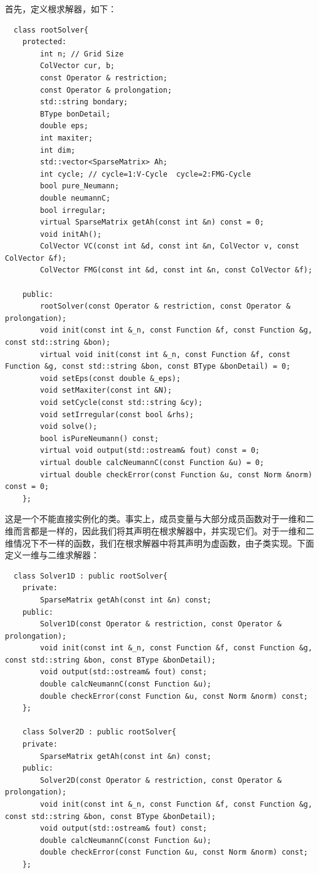 \documentclass[lang=cn,10pt]{elegantbook}
\begin{document}
首先，定义根求解器，如下：
\begin{lstlisting}
  class rootSolver{
    protected:
        int n; // Grid Size
        ColVector cur, b;
        const Operator & restriction;
        const Operator & prolongation;
        std::string bondary;
        BType bonDetail;
        double eps;
        int maxiter;
        int dim;
        std::vector<SparseMatrix> Ah;
        int cycle; // cycle=1:V-Cycle  cycle=2:FMG-Cycle
        bool pure_Neumann;
        double neumannC;
        bool irregular;
        virtual SparseMatrix getAh(const int &n) const = 0;
        void initAh();
        ColVector VC(const int &d, const int &n, ColVector v, const ColVector &f);
        ColVector FMG(const int &d, const int &n, const ColVector &f);
    
    public:
        rootSolver(const Operator & restriction, const Operator & prolongation);
        void init(const int &_n, const Function &f, const Function &g, const std::string &bon);
        virtual void init(const int &_n, const Function &f, const Function &g, const std::string &bon, const BType &bonDetail) = 0;
        void setEps(const double &_eps);
        void setMaxiter(const int &N);
        void setCycle(const std::string &cy);
        void setIrregular(const bool &rhs);
        void solve();
        bool isPureNeumann() const;
        virtual void output(std::ostream& fout) const = 0;
        virtual double calcNeumannC(const Function &u) = 0;
        virtual double checkError(const Function &u, const Norm &norm) const = 0;
    };
\end{lstlisting}

这是一个不能直接实例化的类。事实上，成员变量与大部分成员函数对于一维和二维而言都是一样的，因此我们将其声明在根求解器中，并实现它们。对于一维和二维情况下不一样的函数，我们在根求解器中将其声明为虚函数，由子类实现。下面定义一维与二维求解器：
\begin{lstlisting}
  class Solver1D : public rootSolver{
    private:
        SparseMatrix getAh(const int &n) const;
    public:
        Solver1D(const Operator & restriction, const Operator & prolongation);
        void init(const int &_n, const Function &f, const Function &g, const std::string &bon, const BType &bonDetail);
        void output(std::ostream& fout) const;
        double calcNeumannC(const Function &u);
        double checkError(const Function &u, const Norm &norm) const;
    };
    
    class Solver2D : public rootSolver{
    private:
        SparseMatrix getAh(const int &n) const;
    public:
        Solver2D(const Operator & restriction, const Operator & prolongation);
        void init(const int &_n, const Function &f, const Function &g, const std::string &bon, const BType &bonDetail);
        void output(std::ostream& fout) const;
        double calcNeumannC(const Function &u);
        double checkError(const Function &u, const Norm &norm) const;
    };
\end{lstlisting}
\end{document}
